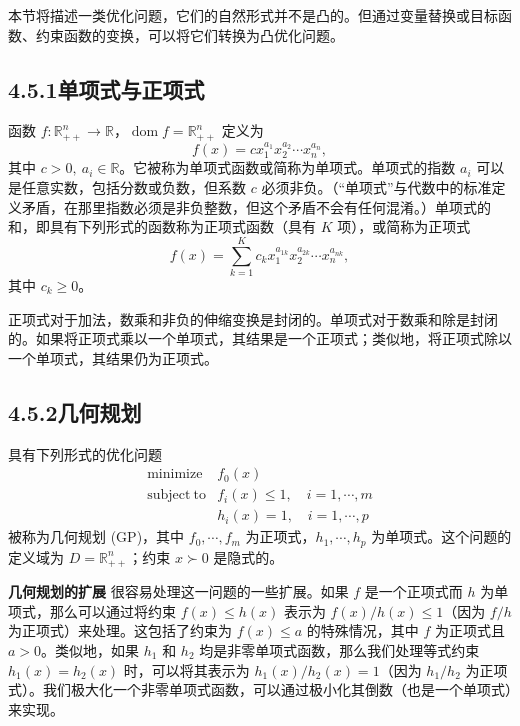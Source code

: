 \documentclass[UTF8,12pt,a4paper,fontset=fandol]{ctexart}
\begin{document}
本节将描述一类优化问题，它们的自然形式并不是凸的。但通过变量替换或目标函数、约束函数的变换，可以将它们转换为凸优化问题。

\subsection*{4.5.1\quad 单项式与正项式}

函数 $f:\mathbb{R}_{++}^n\to\mathbb{R}$，$\operatorname{dom}f=\mathbb{R}_{++}^n$ 定义为
\begin{equation}
f(x)=cx_1^{a_1}x_2^{a_2}\cdots x_n^{a_n},
\tag{4.41}
\end{equation}
其中 $c>0,\ a_i\in\mathbb{R}$。它被称为单项式函数或简称为单项式。单项式的指数 $a_i$ 可以是任意实数，包括分数或负数，但系数 $c$ 必须非负。（“单项式”与代数中的标准定义矛盾，在那里指数必须是非负整数，但这个矛盾不会有任何混淆。）单项式的和，即具有下列形式的函数称为正项式函数（具有 $K$ 项），或简称为正项式
\begin{equation}
f(x)=\sum_{k=1}^K c_k x_1^{a_{1k}}x_2^{a_{2k}}\cdots x_n^{a_{nk}},
\tag{4.42}
\end{equation}
其中 $c_k\geq 0$。

正项式对于加法，数乘和非负的伸缩变换是封闭的。单项式对于数乘和除是封闭的。如果将正项式乘以一个单项式，其结果是一个正项式；类似地，将正项式除以一个单项式，其结果仍为正项式。

\subsection*{4.5.2\quad 几何规划}

具有下列形式的优化问题
\begin{equation}
\begin{array}{ll}
\mathop{\mathrm{minimize}} & f_0(x)\\
\mathrm{subject\ to} & f_i(x)\leq 1,\quad i=1,\cdots,m\\
& h_i(x)=1,\quad i=1,\cdots,p
\end{array}
\tag{4.43}
\end{equation}
被称为几何规划 (GP)，其中 $f_0,\cdots,f_m$ 为正项式，$h_1,\cdots,h_p$ 为单项式。这个问题的定义域为 $D=\mathbb{R}_{++}^n$；约束 $x\succ 0$ 是隐式的。

\noindent\textbf{几何规划的扩展}\quad
很容易处理这一问题的一些扩展。如果 $f$ 是一个正项式而 $h$ 为单项式，那么可以通过将约束 $f(x)\leq h(x)$ 表示为 $f(x)/h(x)\leq 1$（因为 $f/h$ 为正项式）来处理。这包括了约束为 $f(x)\leq a$ 的特殊情况，其中 $f$ 为正项式且 $a>0$。类似地，如果 $h_1$ 和 $h_2$ 均是非零单项式函数，那么我们处理等式约束 $h_1(x)=h_2(x)$ 时，可以将其表示为 $h_1(x)/h_2(x)=1$（因为 $h_1/h_2$ 为正项式）。我们极大化一个非零单项式函数，可以通过极小化其倒数（也是一个单项式）来实现。
\end{document}
